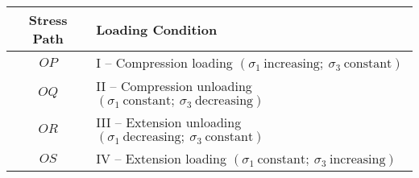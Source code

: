 \begin{tabular}{|c|p{9cm}|}
\hline
\textbf{Stress Path} & \textbf{Loading Condition} \\ \hline
$OP$ & I -- Compression loading $(\sigma_1 \ \text{increasing}; \ \sigma_3 \ \text{constant})$ \\ \hline
$OQ$ & II -- Compression unloading $(\sigma_1 \ \text{constant}; \ \sigma_3 \ \text{decreasing})$ \\ \hline
$OR$ & III -- Extension unloading $(\sigma_1 \ \text{decreasing}; \ \sigma_3 \ \text{constant})$ \\ \hline
$OS$ & IV -- Extension loading $(\sigma_1 \ \text{constant}; \ \sigma_3 \ \text{increasing})$ \\ \hline
\end{tabular}  